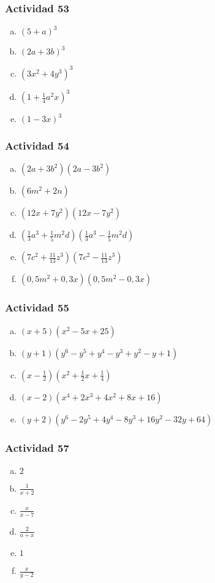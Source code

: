 \documentclass[a4paper, twocolumn]{article}
\begin{document}
\subsubsection*{Actividad 53}
\begin{enumerate}[a)]
\item $(5+a)^3$
\item $(2a+3b)^3$
\item $(3x^2+4y^3)^3$
\item $(1+\frac{1}{4}a^2x)^3$
\item $(1-3x)^3$


\end{enumerate}

\subsubsection*{Actividad 54}
\begin{enumerate}[a)]
\item $(2a+3b^2)(2a-3b^2)$
\item $(6m^2+2n)$
\item $(12x+7y^2)(12x-7y^2)$
\item $(\frac{1}{3} a^3 + \frac{1}{5} m^2 d)(\frac{1}{3} a^3 - \frac{1}{5} m^2 d)$
\item $(7c^2+\frac{11}{13}z^3)(7c^2-\frac{11}{13}z^3)$
\item $(0,5m^2+0,3x)(0,5m^2-0,3x)$
\end{enumerate}

\subsubsection*{Actividad 55}
\begin{enumerate}[a)]
\item $(x+5)(x^2 -5x + 25)$
\item $(y+1)(y^6-y^5+y^4-y^3+y^2-y+1)$
\item $(x-\frac{1}{2})(x^2 + \frac{1}{2} x + \frac{1}{4})$
\item $(x-2)(x^4+2x^3+4x^2+8x+16)$
\item $(y+2)(y^6 - 2y^5 + 4y^4 - 8y^3 + 16y^2 - 32y + 64)$
\end{enumerate}

\subsubsection*{Actividad 57}
\begin{enumerate}[a)]
\item $2$
\item $\frac{1}{x+2}$
\item $\frac{x}{x-7}$
\item $\frac{2}{a+x}$
\item $1$
\item $\frac{x}{y-2}$
\end{enumerate}
\end{document}
